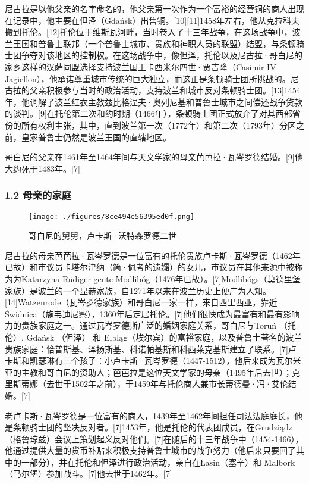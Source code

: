 尼古拉是以他父亲的名字命名的，他父亲第一次作为一个富裕的经营铜的商人出现在记录中，他主要在但泽（Gdańsk）出售铜。[10][11]1458年左右，他从克拉科夫搬到托伦。[12]托伦位于维斯瓦河畔，当时卷入了十三年战争，在这场战争中，波兰王国和普鲁士联邦（一个普鲁士城市、贵族和神职人员的联盟）结盟，与条顿骑士团争夺对该地区的控制权。在这场战争中，像但泽，托伦以及尼古拉·哥白尼的家乡这样的汉萨同盟选择支持波兰国王卡西米尔四世·贾吉隆（Casimir IV Jagiellon），他承诺尊重城市传统的巨大独立，而这正是条顿骑士团所挑战的。尼古拉的父亲积极参与当时的政治活动，支持波兰和城市反对条顿骑士团。[13]1454年，他调解了波兰红衣主教兹比格涅夫·奥列尼基和普鲁士城市之间偿还战争贷款的谈判。[9]在托伦第二次和约时期（1466年），条顿骑士团正式放弃了对其西部省份的所有权利主张，其中，直到波兰第一次（1772年）和第二次（1793年）分区之前，皇家普鲁士仍然是波兰王国的直辖地区。

哥白尼的父亲在1461年至1464年间与天文学家的母亲芭芭拉·瓦岑罗德结婚。[9]他大约死于1483年。[7]

\subsubsection{1.2 母亲的家庭}
\begin{figure}[ht]
\centering
\texttt{[image: ./figures/8ce494e56395ed0f.png]}
\caption{哥白尼的舅舅，卢卡斯·沃特森罗德二世} \label{fig_GBN_2}
\end{figure}
尼古拉的母亲芭芭拉·瓦岑罗德是一位富有的托伦贵族卢卡斯·瓦岑罗德（1462年已故）和市议员卡塔尔津纳（简·佩考的遗孀）的女儿，市议员在其他来源中被称为为Katarzyna Rüdiger gente Modlibóg（1476年已故）。[7]Modlibógs（莫德里堡家族）是波兰的一个显赫家族，自1271年以来在波兰历史上便广为人知。[14]Watzenrode（瓦岑罗德家族）和哥白尼一家一样，来自西里西亚，靠近Świdnica（施韦迪尼察），1360年后定居托伦。[7]他们很快成为最富有和最有影响力的贵族家庭之一。通过瓦岑罗德斯广泛的婚姻家庭关系，哥白尼与Toruń （托伦）, Gdańsk （但泽） 和 Elbląg（埃尔宾）的富裕家庭，以及普鲁士著名的波兰贵族家庭：恰普斯基、泽扬斯基、科诺帕基斯和科西莱克基斯建立了联系。[7]卢卡斯和凯瑟琳有三个孩子：小卢卡斯·瓦岑罗德（1447-1512），他后来成为瓦尔米亚的主教和哥白尼的资助人；芭芭拉是这位天文学家的母亲（1495年后去世）；克里斯蒂娜（去世于1502年之前），于1459年与托伦商人兼市长蒂德曼·冯·艾伦结婚。[7]

老卢卡斯·瓦岑罗德是一位富有的商人，1439年至1462年间担任司法法庭庭长，他是条顿骑士团的坚决反对者。[7]1453年，他是托伦的代表团成员，在Grudziądz （格鲁琼兹）会议上策划起义反对他们。[7]在随后的十三年战争中（1454-1466），他通过提供大量的货币补贴来积极支持普鲁士城市的战争努力（他后来只要回了其中的一部分），并在托伦和但泽进行政治活动，亲自在Łasin（塞辛）和 Malbork （马尔堡）参加战斗。[7]他去世于1462年。[7]

